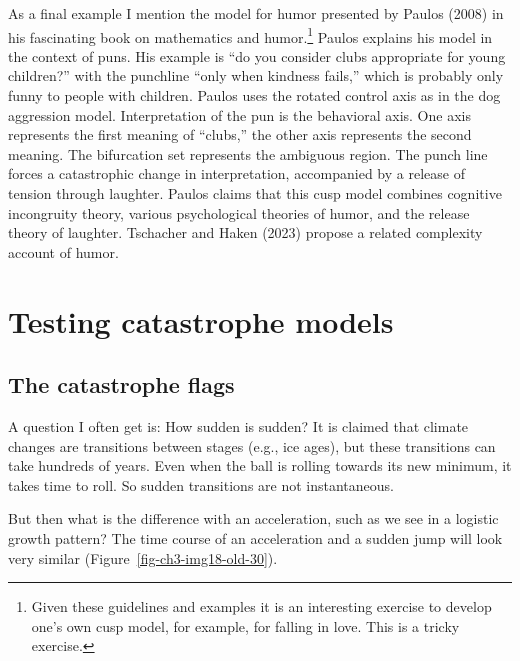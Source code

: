 \documentclass[
  a4paper,
  DIV=11,
  numbers=noendperiod,
  oneside]{scrreprt}
\begin{document}
As a final example I mention the model for humor presented by Paulos
(2008) in his fascinating book on mathematics and humor.\footnote{Given
  these guidelines and examples it is an interesting exercise to develop
  one's own cusp model, for example, for falling in love. This is a
  tricky exercise.} Paulos explains his model in the context of puns.
His example is ``do you consider clubs appropriate for young children?''
with the punchline ``only when kindness fails,'' which is probably only
funny to people with children. Paulos uses the rotated control axis as
in the dog aggression model. Interpretation of the pun is the behavioral
axis. One axis represents the first meaning of ``clubs,'' the other axis
represents the second meaning. The bifurcation set represents the
ambiguous region. The punch line forces a catastrophic change in
interpretation, accompanied by a release of tension through laughter.
Paulos claims that this cusp model combines cognitive incongruity
theory, various psychological theories of humor, and the release theory
of laughter. Tschacher and Haken (2023) propose a related complexity
account of humor.

\hypertarget{sec-Testing-catastrophe-models}{%
\section{Testing catastrophe
models}\label{sec-Testing-catastrophe-models}}

\hypertarget{sec-The-catastrophe-flags}{%
\subsection{The catastrophe flags}\label{sec-The-catastrophe-flags}}

A question I often get is: How sudden is sudden? It is claimed that
climate changes are transitions between stages (e.g., ice ages), but
these transitions can take hundreds of years. Even when the ball is
rolling towards its new minimum, it takes time to roll. So sudden
transitions are not instantaneous.

But then what is the difference with an acceleration, such as we see in
a logistic growth pattern? The time course of an acceleration and a
sudden jump will look very similar (Figure~\ref{fig-ch3-img18-old-30}).
\end{document}
